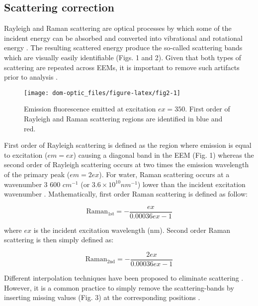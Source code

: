 \documentclass[]{book}
\begin{document}
\subsection{Scattering correction}\label{scattering-correction}

Rayleigh and Raman scattering are optical processes by which some of the
incident energy can be absorbed and converted into vibrational and
rotational energy \citep{Lakowicz2006}. The resulting scattered energy
produce the so-called scattering bands which are visually easily
identifiable (Figs. 1 and 2). Given that both types of scattering are
repeated across EEMs, it is important to remove such artifacts prior to
analysis \citep{Bahram2006, Zepp2004}.

\begin{figure}

{\centering \texttt{[image: dom-optic\_files/figure-latex/fig2-1]} 

}

\caption{Emission fluorescence emitted at excitation $ex = 350$. First order of Rayleigh and Raman scattering regions are identified in blue and red.}\label{fig:fig2}
\end{figure}

First order of Rayleigh scattering is defined as the region where
emission is equal to excitation (\(em = ex\)) causing a diagonal band in
the EEM (Fig. 1) whereas the second order of Rayleigh scattering occurs
at two times the emission wavelength of the primary peak (\(em = 2ex\)).
For water, Raman scattering occurs at a wavenumber 3 600 \(cm^{-1}\) (or
\(3.6 \times 10^{10} nm^{-1}\)) lower than the incident excitation
wavenumber \citep{Lakowicz2006}. Mathematically, first order Raman
scattering is defined as follow:

\begin{equation}
\text{Raman}_{\text{1st}} = -\frac{ex}{0.00036 ex - 1}
\label{eq:raman1}
\end{equation}

where \(ex\) is the incident excitation wavelength (nm). Second order
Raman scattering is then simply defined as:

\begin{equation}
\text{Raman}_{\text{2nd}} = -\frac{2ex}{0.00036 ex - 1}
\label{eq:raman2}
\end{equation}

Different interpolation techniques have been proposed to eliminate
scattering \citep{Zepp2004, Bahram2006}. However, it is a common
practice to simply remove the scattering-bands by inserting missing
values (Fig. 3) at the corresponding positions
\citep{Murphy2013, Stedmon2008}.
\end{document}
